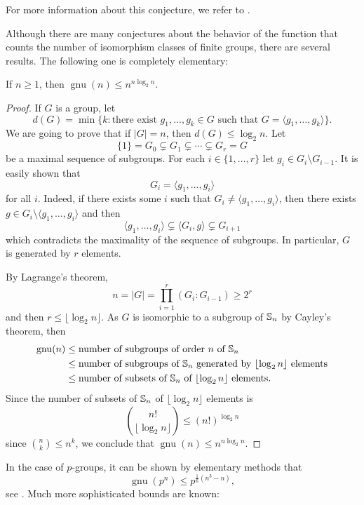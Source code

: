 For more information about this conjecture, we refer to \cite[\S21.6]{MR2382539}.

Although there are many conjectures about the behavior of the function that counts the number of isomorphism classes of finite groups, there are several results. The following one is completely elementary:

\begin{theorem}
If $n\geq1$, then $\operatorname{gnu}(n)\leq n^{n\log_2 n}$.
\end{theorem}

\begin{proof}
If $G$ is a group, let
\[
d(G)=\min\{k:\text{there exist }g_1,\dots,g_k\in G\text{ such that }G=\langle g_1,\dots,g_k\rangle\}.
\]
We are going to prove that if $|G|=n$, then $d(G)\leq\log_2 n$. Let
\[
\{1\}=G_0\subsetneq G_1\subsetneq\cdots\subsetneq G_r=G
\]
be a maximal sequence of subgroups. For each $i\in\{1,\dots,r\}$ let
$g_i\in G_i\setminus G_{i-1}$. It is easily shown
that
\[
G_i=\langle g_1,\dots,g_i\rangle
\]
for all $i$. 
Indeed, if there exists some $i$ such that $G_i\ne\langle g_1,\dots,g_i\rangle$, then
there exists $g\in G_i\setminus\langle g_1,\dots,g_i\rangle$ and then
\[
\langle g_1,\dots,g_i\rangle\subsetneq \langle G_i,g\rangle\subsetneq G_{i+1}
\]
which contradicts the maximality of the sequence of subgroups. In particular, $G$ is generated 
by $r$ elements.

By Lagrange's theorem, 
\[
n=|G|=\prod_{i=1}^r(G_i:G_{i-1})\geq 2^r
\]
and then $r\leq\lfloor \log_2 n\rfloor$. 
As $G$ is isomorphic to a 
subgroup of $\mathbb{S}_n$ by Cayley's theorem, then 
\begin{align*}
\operatorname{gnu}(n)
&\leq\text{number of subgroups of order $n$ of $\mathbb{S}_n$}\\
&\leq\text{number of subgroups of $\mathbb{S}_n$ generated by $\lfloor\log_2n\rfloor$ elements}\\
&\leq\text{number of subsets of $\mathbb{S}_n$ of $\lfloor\log_2n\rfloor$ elements}.
\end{align*}
Since the number of subsets of $\mathbb{S}_n$ of $\lfloor\log_2n\rfloor$ elements
is
\[
\binom{n!}{\lfloor\log_2n\rfloor}\leq(n!)^{\log_2n}
\]
since $\binom{n}{k}\leq n^k$, we conclude that $\operatorname{gnu}(n)\leq n^{n\log_2n}$.
\end{proof}

In the case of $p$-groups, it can be shown by elementary methods 
that
\[
\operatorname{gnu}(p^n)\leq p^{\frac16(n^3-n)},
\]
see \cite[Theorem 5.1]{MR2382539}. Much more sophisticated bounds are known:

